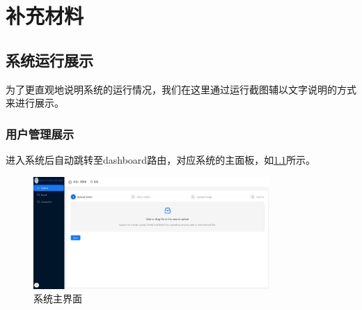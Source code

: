 
\chapter{补充材料}


\section{系统运行展示}

为了更直观地说明系统的运行情况，我们在这里通过运行截图辅以文字说明的方式来进行展示。

\subsection{用户管理展示}

进入系统后自动跳转至dashboard路由，对应系统的主面板，如\ref{append:dashboard}所示。

\begin{figure}[ht]
    \centering
    \includegraphics[width=0.8\textwidth]{source/append/dashboard.png}
    \caption{系统主界面}
    \label{append:dashboard}
\end{figure}
